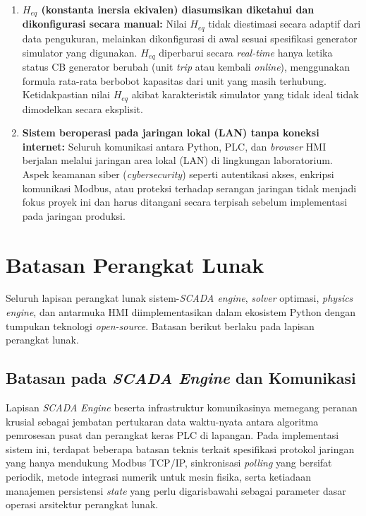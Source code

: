 \begin{enumerate}
    \item[g.] \textbf{$H_{eq}$ (konstanta inersia ekivalen) diasumsikan diketahui dan dikonfigurasi secara manual:} Nilai $H_{eq}$ tidak diestimasi secara adaptif dari data pengukuran, melainkan dikonfigurasi di awal sesuai spesifikasi generator simulator yang digunakan. $H_{eq}$ diperbarui secara \textit{real-time} hanya ketika status CB generator berubah (unit \textit{trip} atau kembali \textit{online}), menggunakan formula rata-rata berbobot kapasitas dari unit yang masih terhubung. Ketidakpastian nilai $H_{eq}$ akibat karakteristik simulator yang tidak ideal tidak dimodelkan secara eksplisit.
    \item[h.] \textbf{Sistem beroperasi pada jaringan lokal (LAN) tanpa koneksi internet:} Seluruh komunikasi antara Python, PLC, dan \textit{browser} HMI berjalan melalui jaringan area lokal (LAN) di lingkungan laboratorium. Aspek keamanan siber (\textit{cybersecurity}) seperti autentikasi akses, enkripsi komunikasi Modbus, atau proteksi terhadap serangan jaringan tidak menjadi fokus proyek ini dan harus ditangani secara terpisah sebelum implementasi pada jaringan produksi.
\end{enumerate}

\section{Batasan Perangkat Lunak}
\label{sec:Batasan_Perangkat_Lunak}

Seluruh lapisan perangkat lunak sistem-\textit{SCADA engine}, \textit{solver} optimasi, \textit{physics engine}, dan antarmuka HMI diimplementasikan dalam ekosistem Python dengan tumpukan teknologi \textit{open-source}. Batasan berikut berlaku pada lapisan perangkat lunak.

\subsection{Batasan pada \textit{SCADA Engine} dan Komunikasi}
\label{subsec:Batasan_SCADA_Engine_dan_Komunikasi}

Lapisan \textit{SCADA Engine} beserta infrastruktur komunikasinya memegang peranan krusial sebagai jembatan pertukaran data waktu-nyata antara algoritma pemrosesan pusat dan perangkat keras PLC di lapangan. Pada implementasi sistem ini, terdapat beberapa batasan teknis terkait spesifikasi protokol jaringan yang hanya mendukung Modbus TCP/IP, sinkronisasi \textit{polling} yang bersifat periodik, metode integrasi numerik untuk mesin fisika, serta ketiadaan manajemen persistensi \textit{state} yang perlu digarisbawahi sebagai parameter dasar operasi arsitektur perangkat lunak.


